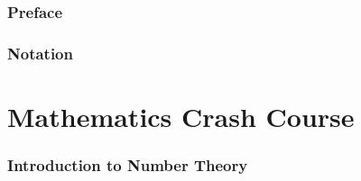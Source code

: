\documentclass{config/zkdl-template}
\def\maketitle{
    
    \thispagestyle{empty}
    \pagebreak
}
\begin{document}
    \maketitle

    \pagecolor{white}

    \vspace*{\fill}
    

    \begin{abstract}
        \fontsize{10}{12}\selectfont

        \vspace{5mm}

        
    \end{abstract}

    \vspace*{\fill}

    \thispagestyle{empty}
    \newpage


    \pagestyle{fancy}
    \pagecolor{white}

    \tableofcontents

    \pagebreak


    \section*{Preface}
    

    

    \section{Notation}\label{section:notation}
    


    \part{Mathematics Crash Course}
    

    \section{Introduction to Number Theory}\label{section:number-theory}
    
\end{document}
